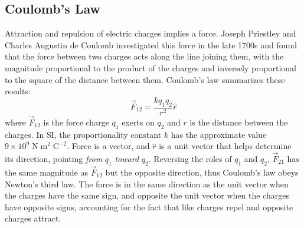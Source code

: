\documentclass[a4paper]{article}
\begin{document}
\subsection{Coulomb's Law}
Attraction and repulsion of electric charges implies a force. Joseph Priestley and Charles Augustin de Coulomb investigated this force in the late 1700s and found that the force between two charges acts along the line joining them, with the magnitude proportional to the product of the charges and inversely proportional to the square of the distance between them. Coulomb's law summarizes these results:
\begin{equation}
    \vec{F}_{12} = \frac{kq_1q_2}{r^2}\hat{r}
\end{equation}
where $\vec{F}_{12}$ is the force charge $q_1$ exerts on $q_2$ and $r$ is the distance between the charges. In SI, the proportionality constant $k$ has the approximate value $9 \times 10^9\; \text{N}\; \text{m}^2\; \text{C}^{-2}$. Force is a vector, and $\hat{r}$ is a unit vector that helps determine its direction, pointing \textit{from} $q_1$ \textit{toward} $q_2$. Reversing the roles of $q_1$ and $q_2$, $\vec{F}_{21}$ has the same magnitude as $\vec{F}_{12}$ but the opposite direction, thus Coulomb's law obeys Newton's third law. The force is in the same direction as the unit vector when the charges have the same sign, and opposite the unit vector when the charges have opposite signs, accounting for the fact that like charges repel and opposite charges attract.
\begin{center}
    \hspace{15mm}
\end{center}
\end{document}
